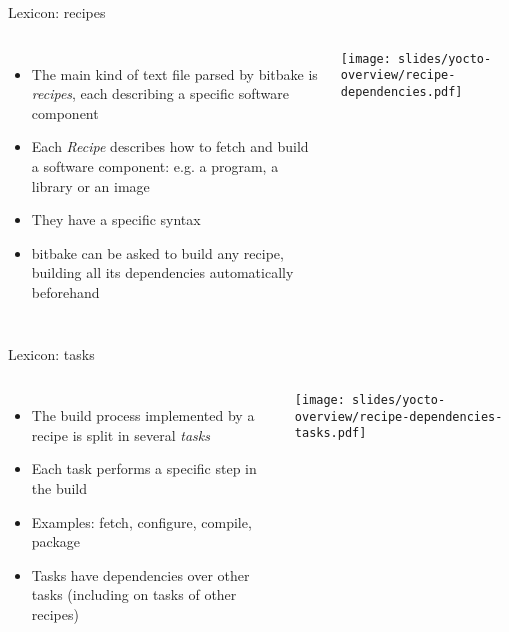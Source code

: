 \begin{frame}{Lexicon: recipes}
  \begin{columns}
    \begin{itemize}
      \item The main kind of text file parsed by bitbake is {\em recipes},
        each describing a specific software component
      \item Each {\em Recipe} describes how to fetch and build a software
        component: e.g. a program, a library or an image
      \item They have a specific syntax
      \item bitbake can be asked to build any recipe, building all its
        dependencies automatically beforehand
    \end{itemize}
    \begin{center}
      \texttt{[image: slides/yocto-overview/recipe-dependencies.pdf]}
    \end{center}
  \end{columns}
\end{frame}

\begin{frame}{Lexicon: tasks}
  \begin{columns}
    \begin{itemize}
      \item The build process implemented by a recipe is split in several
        {\em tasks}
      \item Each task performs a specific step in the build
      \item Examples: fetch, configure, compile, package
      \item Tasks have dependencies over other tasks (including on tasks of
        other recipes)
    \end{itemize}
    \begin{center}
      \texttt{[image: slides/yocto-overview/recipe-dependencies-tasks.pdf]}
    \end{center}
  \end{columns}
\end{frame}

